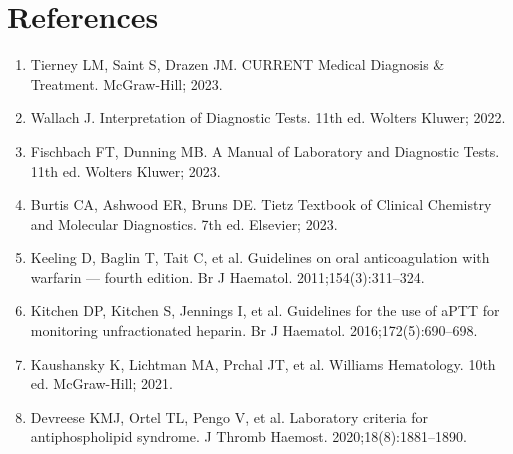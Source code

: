 \section*{References}
\begin{enumerate}
  \item Tierney LM, Saint S, Drazen JM. CURRENT Medical Diagnosis \& Treatment. McGraw-Hill; 2023.
  \item Wallach J. Interpretation of Diagnostic Tests. 11th ed. Wolters Kluwer; 2022.
  \item Fischbach FT, Dunning MB. A Manual of Laboratory and Diagnostic Tests. 11th ed. Wolters Kluwer; 2023.
  \item Burtis CA, Ashwood ER, Bruns DE. Tietz Textbook of Clinical Chemistry and Molecular Diagnostics. 7th ed. Elsevier; 2023.
  \item Keeling D, Baglin T, Tait C, et al. Guidelines on oral anticoagulation with warfarin --- fourth edition. Br J Haematol. 2011;154(3):311--324.
  \item Kitchen DP, Kitchen S, Jennings I, et al. Guidelines for the use of aPTT for monitoring unfractionated heparin. Br J Haematol. 2016;172(5):690--698.
  \item Kaushansky K, Lichtman MA, Prchal JT, et al. Williams Hematology. 10th ed. McGraw-Hill; 2021.
  \item Devreese KMJ, Ortel TL, Pengo V, et al. Laboratory criteria for antiphospholipid syndrome. J Thromb Haemost. 2020;18(8):1881--1890.
\end{enumerate}

\clearpage

